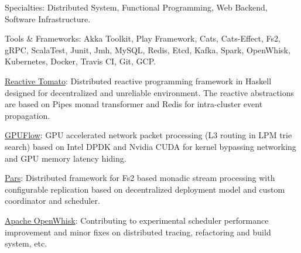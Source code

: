 \documentclass[10pt,a4paper]{article}
\begin{document}
\vspace{0.2em}

\inlineheadsection  %
  {Specialties:}
  {Distributed System, Functional Programming, Web Backend, Software Infrastructure.}

\vspace{0.2em}
\inlineheadsection
  {Tools \& Frameworks:}
  {Akka Toolkit, Play Framework, Cats, Cats-Effect, Fs2, gRPC, ScalaTest, Junit, Jmh, MySQL, Redis, Etcd, Kafka, Spark, OpenWhisk, Kubernetes, Docker, Travis CI, Git, GCP.}

\spacedhrule{1.6em}{-0.4em}


\vspace{0.2em}

\inlineheadsection
  {\href{https://github.com/tz70s/reactive-tomato}{Reactive Tomato}:}
  {Distributed reactive programming framework in Haskell designed for decentralized and unreliable environment.
  The reactive abstractions are based on Pipes monad transformer and Redis for intra-cluster event propagation. }

\vspace{0.2em}

\inlineheadsection
  {\href{https://github.com/tz70s/gpuflow}{GPUFlow}:}
  {GPU accelerated network packet processing (L3 routing in LPM trie search) based on Intel DPDK and Nvidia CUDA for 
  kernel bypassing networking and GPU memory latency hiding.}

\vspace{0.2em}

\inlineheadsection
  {\href{https://github.com/tz70s/pars}{Pars}:}
  {Distributed framework for Fs2 based monadic stream processing with configurable replication based on decentralized deployment model and custom coordinator and scheduler.}

\spacedhrule{1.6em}{-0.4em}


\vspace{0.2em}

\inlineheadsection
  {\href{https://github.com/apache/incubator-openwhisk/commits/master?author=tz70s}{Apache OpenWhisk}:}
  {Contributing to experimental scheduler performance improvement and minor fixes on distributed tracing, 
  refactoring and build system, etc.}

\vspace{0.2em}
\end{document}
